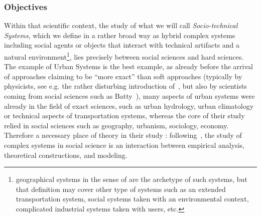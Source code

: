 \subsubsection*{Objectives}

Within that scientific context, the study of what we will call \emph{Socio-technical Systems}, which we define in a rather broad way as hybrid complex systems including social agents or objects that interact with technical artifacts and a natural environment\footnote{geographical systems in the sense of \cite{dollfus1975some} are the archetype of such systems, but that definition may cover other type of systems such as an extended transportation system, social systems taken with an environmental context, complicated industrial systems taken with users, etc.}, lies precisely between social sciences and hard sciences. The example of Urban Systems is the best example, as already before the arrival of approaches claiming to be ``more exact'' than soft approaches (typically by physicists, see e.g. the rather disturbing introduction of~\cite{louf2014scaling}, but also by scientists coming from social sciences such as Batty~\cite{batty2013new}), many aspects of urban systems were already in the field of exact sciences, such as urban hydrology, urban climatology or technical aspects of transportation systems, whereas the core of their study relied in social sciences such as geography, urbanism, sociology, economy. Therefore a necessary place of theory in their study : following~\cite{livet2010}, the study of complex systems in social science is an interaction between empirical analysis, theoretical constructions, and modeling.

